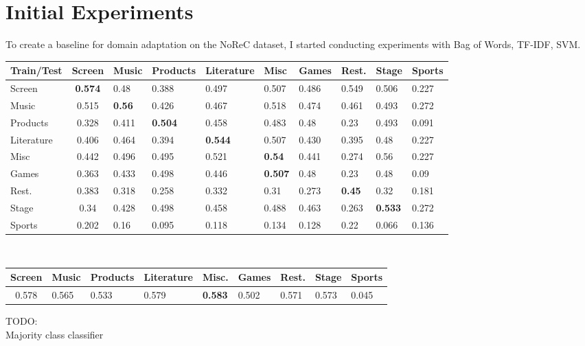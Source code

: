 \section{Initial Experiments}
To create a baseline for domain adaptation on the NoReC dataset, I started conducting experiments with Bag of Words, TF-IDF, SVM.\\
\begin{table}[]
	\begin{tabular}{|l|c|l|l|l|l|l|l|l|l|}
		\hline
		Train/Test & \multicolumn{1}{l|}{Screen}& Music     	 & Products       & Literature 		& Misc 	  		& Games 		& Rest.         & Stage  		& Sports        \\ \hline
		Screen     & \textbf{0.574}             & 0.48           & 0.388          & 0.497	   		& 0.507    		& 0.486			& 0.549         & 0.506  		& 0.227			\\ \hline
		Music	   & 0.515                      & \textbf{0.56}  & 0.426          & 0.467 	   		& 0.518    		& 0.474 		& 0.461         & 0.493  		& 0.272 	   \\ \hline
		Products   & 0.328                      & 0.411			 & \textbf{0.504} & 0.458 	   		& 0.483    		& 0.48	 		& 0.23          & 0.493  		& 0.091        \\ \hline
		Literature & 0.406                      & 0.464          & 0.394          & \textbf{0.544}	& 0.507    		& 0.430 		& 0.395 		& 0.48  		& 0.227		\\ \hline
		Misc  	   & 0.442                      & 0.496 		 & 0.495          & 0.521 	   		& \textbf{0.54}	& 0.441 		& 0.274         & 0.56   		& 0.227   	\\ \hline
		Games      & 0.363                      & 0.433          & 0.498          & 0.446 	   		& \textbf{0.507} & 0.48			& 0.23          & 0.48   		& 0.09 		  \\ \hline
		Rest.      & 0.383 						& 0.318          & 0.258          & 0.332 	   		& 0.31    		& 0.273 		& \textbf{0.45}& 0.32	  		& 0.181        \\ \hline
		Stage      & 0.34 						& 0.428          & 0.498          & 0.458 	   		& 0.488    		& 0.463 		& 0.263			& \textbf{0.533}& 0.272  	\\ \hline
		Sports     & 0.202 						& 0.16           & 0.095          & 0.118 	   		& 0.134    		& 0.128 		& 0.22          & 0.066  		& 0.136   \\ \hline
	\end{tabular}
\end{table}
\\
\begin{table}[]
	\begin{tabular}{|l|l|l|l|l|l|l|l|l|}
		\hline
		Screen                       & Music & Products  & Literature & Misc. & Games & Rest. & Stage & Sports         \\ \hline
		\multicolumn{1}{|c|}{0.578}  & 0.565 & 0.533 	 & 0.579 	  & \textbf{0.583} & 0.502 & 0.571 & 0.573  & 0.045 \\ \hline
	\end{tabular}
\end{table}
TODO:\\
Majority class classifier
